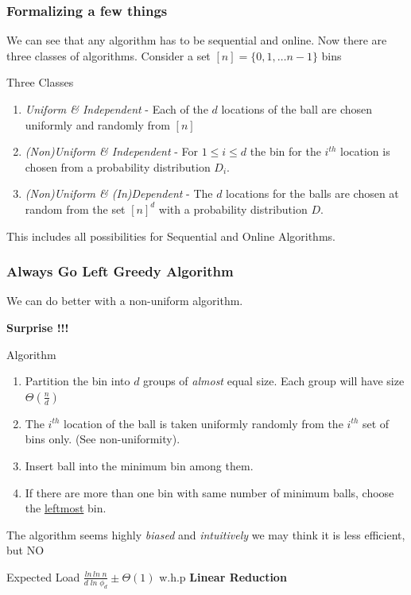 \documentclass{beamer}
\begin{document}
\begin{frame}
\frametitle{Formalizing a few things}
We can see that any algorithm has to be sequential and online. Now there are three classes of algorithms. Consider a set $[n]=\{0,1, \ldots n-1\}$ bins 
\pause
\begin{block}
{Three Classes}
\begin{enumerate}
\item \textit{Uniform \& Independent} - Each of the $d$ locations of the ball are chosen uniformly and randomly from $[n]$
\item \textit{(Non)Uniform \& Independent} - For $1 \leq i \leq d$ the bin for the $i^{th}$ location is chosen from a probability distribution $D_i$.
\item \textit{(Non)Uniform \& (In)Dependent} - The $d$ locations for the balls are chosen at random from the set $[n]^d$ with a probability distribution $D$.
\end{enumerate}
\end{block}
\begin{block}
{}
This includes all possibilities for Sequential and Online Algorithms. 
\end{block}
\end{frame}

\begin{frame}



\frametitle{Always Go Left Greedy Algorithm}
We can do better with a non-uniform algorithm. \pause \\ 
\begin{center}
\textbf{Surprise !!!}                                                        
\end{center}
\pause
\begin{block}
{Algorithm}
\begin{enumerate}
\item Partition the bin into $d$ groups of \textit{almost} equal size. Each group will have size $\Theta(\frac{n}{d})$
\pause
\item The $i^{th}$ location of the ball is taken uniformly randomly from the $i^{th}$ set of bins only. (See non-uniformity).
\pause
\item Insert ball into the minimum bin among them.
\pause
\item If there are more than one bin with same number of minimum balls, choose the \underline{leftmost} bin.  
\end{enumerate}
\end{block}
\pause
The algorithm seems highly \textit{biased} and \textit{intuitively} we may think it is less efficient, but NO
\pause
\begin{block}
{Expected Load}
$\frac{ln \, ln \; n}{d \; ln \; {\phi_d} }  \pm \Theta (1)$ w.h.p \pause \textbf{Linear Reduction}
\end{block}
 
\end{frame}
\end{document}

